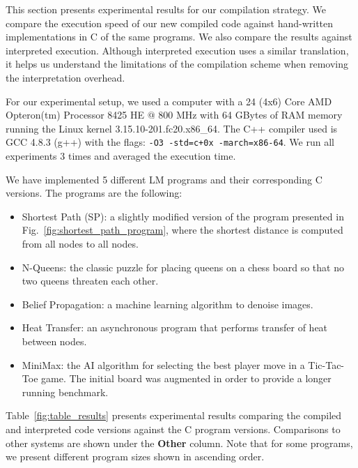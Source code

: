 This section presents experimental results for our compilation strategy.  We
compare the execution speed of our new compiled code against hand-written
implementations in C of the same programs. We also compare the results against
interpreted execution. Although interpreted execution uses a similar
translation, it helps us understand the limitations of the compilation scheme
when removing the interpretation overhead.

For our experimental setup, we used a computer with a 24 (4x6) Core AMD
Opteron(tm) Processor 8425 HE $@$ 800 MHz with 64 GBytes of RAM memory running
the Linux kernel 3.15.10-201.fc20.x86\_64. The C++ compiler used is GCC 4.8.3
(g++) with the flags: \texttt{-O3 -std=c+0x -march=x86-64}.  We run all
experiments 3 times and averaged the execution time.

We have implemented 5 different LM programs and their corresponding
C versions. The programs are the following:

\begin{itemize}

\item Shortest Path (SP): a slightly modified version of the program presented
   in Fig.~\ref{fig:shortest_path_program}, where the shortest distance is
   computed from all nodes to all nodes.

\item N-Queens: the classic puzzle for placing queens on a chess board so that
no two queens threaten each other.

\item Belief Propagation: a machine learning algorithm to denoise images.

\item Heat Transfer: an asynchronous program that performs transfer of heat
between nodes.

\item MiniMax: the AI algorithm for selecting the best player move in
   a Tic-Tac-Toe game. The initial board was augmented in order to provide a
   longer running benchmark.

\end{itemize}

Table~\ref{fig:table_results} presents experimental results comparing the
compiled and interpreted code versions against the C program versions.
Comparisons to other systems are shown under the \textbf{Other} column. Note
that for some programs, we present different program sizes shown in ascending
order.

